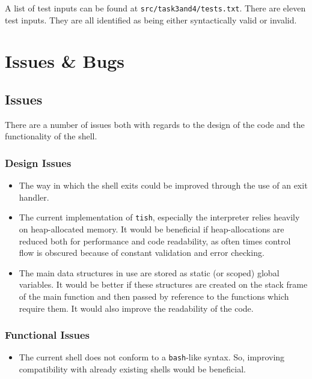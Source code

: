 \documentclass[12pt]{article}
\begin{document}
\newpage



A list of test inputs can be found at
\texttt{src/task3and4/tests.txt}. There are eleven test inputs.
They are all identified as being either syntactically valid or
invalid.

\section{Issues \& Bugs}

\subsection{Issues}

There are a number of issues both with regards to the design of
the code and the functionality of the shell.

\subsubsection{Design Issues}

\begin{itemize}
\item
  The way in which the shell exits could be improved through the
  use of an exit handler.
\item
  The current implementation of \texttt{tish}, especially the
  interpreter relies heavily on heap-allocated memory. It would
  be beneficial if heap-allocations are reduced both for
  performance and code readability, as often times
  control flow is obscured because of constant validation and
  error checking.
\item
  The main data structures in use are stored as static (or
  scoped) global variables. It would be better if these
  structures are created on the stack frame of the main function
  and then passed by reference to the functions which require
  them. It would also improve the readability of the code.
\end{itemize}

\subsubsection{Functional Issues}

\begin{itemize}
\item
  The current shell does not conform to a \texttt{bash}-like
  syntax. So, improving compatibility with already existing
  shells would be beneficial.
\end{itemize}
\end{document}
